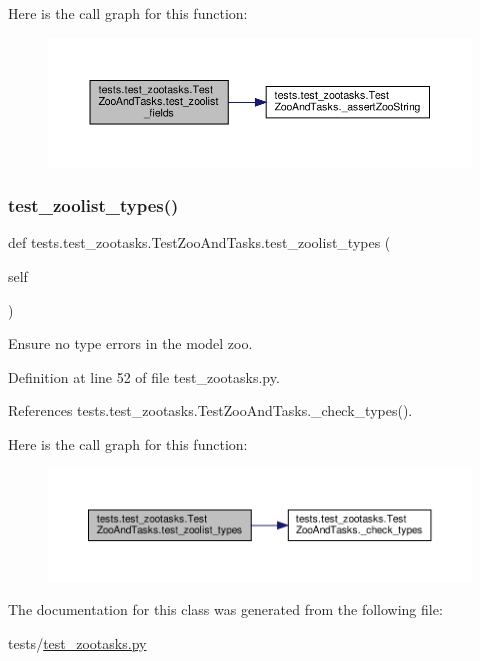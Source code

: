 Here is the call graph for this function\+:
\nopagebreak
\begin{figure}[H]
\begin{center}
\leavevmode
\includegraphics[width=350pt]{classtests_1_1test__zootasks_1_1TestZooAndTasks_a57e8f4db75b9eb31263d4e269c40068f_cgraph}
\end{center}
\end{figure}
\mbox{\label{classtests_1_1test__zootasks_1_1TestZooAndTasks_a8d7616fa41ed03322c86a565eedb4e8c}} 
\subsubsection{\texorpdfstring{test\+\_\+zoolist\+\_\+types()}{test\_zoolist\_types()}}
{\footnotesize\ttfamily def tests.\+test\+\_\+zootasks.\+Test\+Zoo\+And\+Tasks.\+test\+\_\+zoolist\+\_\+types (\begin{DoxyParamCaption}\item[{}]{self }\end{DoxyParamCaption})}

\begin{DoxyVerb}Ensure no type errors in the model zoo.\end{DoxyVerb}
 

Definition at line 52 of file test\+\_\+zootasks.\+py.



References tests.\+test\+\_\+zootasks.\+Test\+Zoo\+And\+Tasks.\+\_\+check\+\_\+types().

Here is the call graph for this function\+:
\nopagebreak
\begin{figure}[H]
\begin{center}
\leavevmode
\includegraphics[width=350pt]{classtests_1_1test__zootasks_1_1TestZooAndTasks_a8d7616fa41ed03322c86a565eedb4e8c_cgraph}
\end{center}
\end{figure}


The documentation for this class was generated from the following file\+:\begin{DoxyCompactItemize}
\item 
tests/\hyperlink{test__zootasks_8py}{test\+\_\+zootasks.\+py}\end{DoxyCompactItemize}

